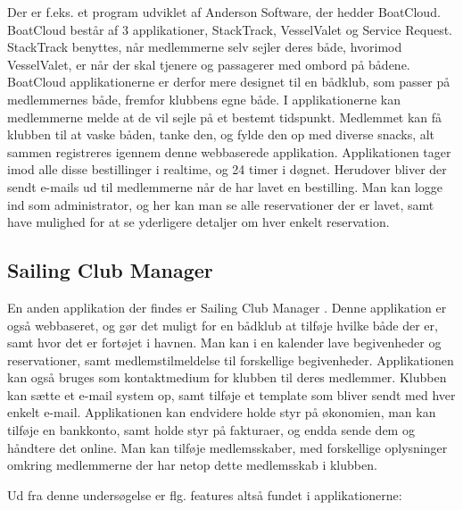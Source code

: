 Der er f.eks. et program udviklet af Anderson Software, der hedder BoatCloud.\citep{BoatCloud} BoatCloud består af 3
applikationer, StackTrack, VesselValet og Service Request.  StackTrack benyttes, når medlemmerne selv sejler deres både,
hvorimod VesselValet, er når der skal tjenere og passagerer med ombord på bådene. BoatCloud applikationerne er derfor
mere designet til en bådklub, som passer på medlemmernes både, fremfor klubbens egne både. I
applikationerne kan medlemmerne melde at de vil sejle på et bestemt tidspunkt. Medlemmet kan få klubben til at vaske
båden, tanke den, og fylde den op med diverse snacks, alt sammen registreres igennem denne webbaserede applikation.
Applikationen tager imod alle disse bestillinger i realtime, og 24 timer i døgnet. Herudover bliver der sendt e-mails ud
til medlemmerne når de har lavet en bestilling. Man kan logge ind som administrator, og her kan man se alle
reservationer der er lavet, samt have mulighed for at se yderligere detaljer om hver enkelt reservation.


\subsection*{Sailing Club Manager}

En anden applikation der findes er Sailing Club Manager \citep{SailClub}. Denne applikation er også webbaseret, og gør
det muligt for en bådklub at tilføje hvilke både der er, samt hvor det er fortøjet i havnen. Man kan i en kalender lave
begivenheder og reservationer, samt medlemstilmeldelse til forskellige begivenheder. Applikationen kan også bruges som kontaktmedium for
klubben til deres medlemmer. Klubben kan sætte et e-mail system op, samt tilføje et template som bliver sendt med hver
enkelt e-mail. Applikationen kan endvidere holde styr på økonomien, man kan tilføje en bankkonto, samt  holde styr på
fakturaer, og endda sende dem og håndtere det online. Man kan tilføje medlemsskaber, med forskellige oplysninger omkring
medlemmerne der har netop dette medlemsskab i klubben.

Ud fra denne undersøgelse er flg. features altså fundet i applikationerne:

